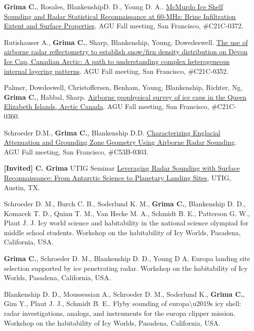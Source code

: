 \begin{etaremune}
\item
  \textbf{Grima C.}, Rosales, BlankenshipD. D., Young D. A..
  \href{https://agu.confex.com/agu/fm14/meetingapp.cgi/Paper/22986}{McMurdo
  Ice Shelf Sounding and Radar Statistical Reconnaissance at 60-MHz:
  Brine Infiltration Extent and Surface Properties}. AGU Fall meeting,
  San Francisco, \#C21C-0372.
\item
  Rutishauser A., \textbf{Grima C.}, Sharp, Blankenship, Young,
  Dowedeswell.
  \href{https://agu.confex.com/agu/fm14/meetingapp.cgi/Paper/17159}{The
  use of airborne radar reflectometry to establish snow/firn density
  distribution on Devon Ice Cap, Canadian Arctic: A path to
  understanding complex heterogeneous internal layering patterns}. AGU
  Fall meeting, San Francisco, \#C21C-0352.
\item
  Palmer, Dowdeswell, Christoffersen, Benham, Young, Blankenship,
  Richter, Ng, \textbf{Grima C.}, Habbal, Sharp.
  \href{https://agu.confex.com/agu/fm14/meetingapp.cgi/Paper/15672}{Airborne
  geophysical survey of ice caps in the Queen Elizabeth Islands, Arctic
  Canada}. AGU Fall meeting, San Francisco, \#C21C-0360.
\item
  Schroeder D.M., \textbf{Grima C.}, Blankenship D.D.
  \href{https://agu.confex.com/agu/fm14/meetingapp.cgi/Paper/8154}{Characterizing
  Englacial Attenuation and Grounding Zone Geometry Using Airborne Radar
  Sounding}. AGU Fall meeting, San Francisco, \#C53B-0303.
\item
  \textbf{{[}Invited{]} C. Grima} UTIG Seminar
  \href{http://mediasite.jsg.utexas.edu/UTMediasite/Play/7b4636e8db6844d79de9e32a14f142781d}{Leveraging
  Radar Sounding with Surface Reconnaissance: From Antarctic Science to
  Planetary Landing Sites}, UTIG, Austin, TX.
\item
  Schroeder D. M., Burch C. B., Soderlund K. M., \textbf{Grima C.},
  Blankenship D. D., Komacek T. D., Quinn T. M., Van Hecke M. A.,
  Schmidt B. E., Patterson G. W., Plaut J. J. Icy world science and
  habitability in the national science olympiad for middle school
  students. Workshop on the habitability of Icy Worlds, Pasadena,
  California, USA.
\item
  \textbf{Grima C.}, Schroeder D. M., Blankenship D. D., Young D A.
  Europa landing site selection supported by ice penetrating radar.
  Workshop on the habitability of Icy Worlds, Pasadena, California, USA.
\item
  Blankenship D. D., Moussessian A., Schroeder D. M., Soderlund K.,
  \textbf{Grima C.}, Gim Y., Plaut J. J., Schmidt B. E.. Flyby sounding
  of europa\textbackslash{}u2019s icy shell: radar investigations,
  analogs, and instruments for the europa clipper mission. Workshop on
  the habitability of Icy Worlds, Pasadena, California, USA.


\end{etaremune}

